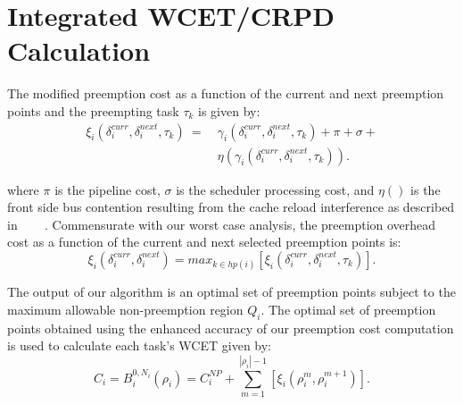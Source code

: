 \vspace{-10pt}
\section{Integrated WCET/CRPD Calculation}\label{sec:schedulability_analysis}

The modified preemption cost as a function of the current and next preemption points and the preempting task \begin{math}\tau_{k}\end{math} is given by:
\begin{equation}\label{eqn:prempt-cost}
\begin{split}
    \xi_{i}(\delta_{i}^{curr},\delta_{i}^{next},\tau_{k})\ =\ &\gamma_{i}(\delta_{i}^{curr},\delta_{i}^{next},\tau_{k}) + \pi + \sigma + \\ &\eta(\gamma_{i}(\delta_{i}^{curr},\delta_{i}^{next},\tau_{k})).
\end{split}
\end{equation}

 \noindent
 where \begin{math}\pi\end{math} is the pipeline cost, \begin{math}\sigma\end{math} is the scheduler processing cost, and \begin{math}\eta()\end{math} is the front side bus contention resulting from the cache reload interference as described in~\cite{pellizzoni:07} ~\cite{pellizzoni:08} ~\cite{pellizzoni:11}.  Commensurate with our worst case analysis, the preemption overhead cost as a function of the current and next selected preemption points is:
\begin{equation}\label{eqn:prempt-cost}
    \xi_{i}(\delta_{i}^{curr},\delta_{i}^{next}) = \textit{max}_{k \in hp(i)} [ \xi_{i}(\delta_{i}^{curr},\delta_{i}^{next},\tau_{k})].
\end{equation}

The output of our algorithm is an optimal set of preemption points subject to the maximum allowable non-preemption region \begin{math}Q_{i}\end{math}.  The optimal set of preemption points obtained using the enhanced accuracy of our preemption cost computation is used to calculate each task's WCET given by:
\begin{equation}\label{eqn:wcet-cost}
   C_{i} = B_{i}^{0,N_{i}}(\rho_{i}) = C_{i}^{NP} + \sum_{m=1}^{|\rho_{i}|-1} [\xi_{i}(\rho_{i}^{m},\rho_{i}^{m+1})].
\end{equation}

